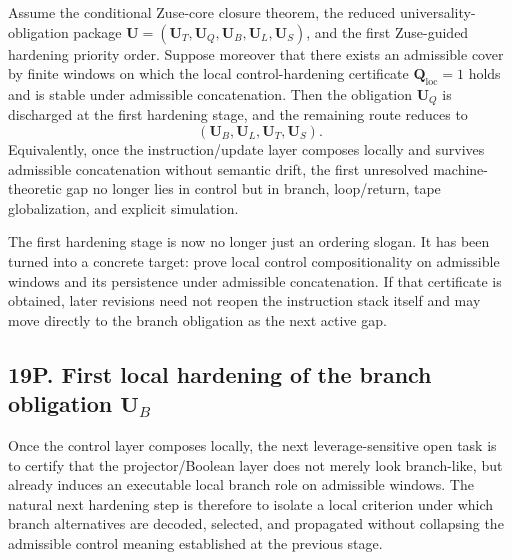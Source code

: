 \begin{proposition}
Assume the conditional Zuse-core closure theorem, the reduced universality-obligation package \(\mathbf U=(\mathbf U_T,\mathbf U_Q,\mathbf U_B,\mathbf U_L,\mathbf U_S)\), and the first Zuse-guided hardening priority order. Suppose moreover that there exists an admissible cover by finite windows on which the local control-hardening certificate \(\mathbf Q_{\mathrm{loc}}=1\) holds and is stable under admissible concatenation. Then the obligation \(\mathbf U_Q\) is discharged at the first hardening stage, and the remaining route reduces to
\[
(\mathbf U_B,\mathbf U_L,\mathbf U_T,\mathbf U_S).
\]
Equivalently, once the instruction/update layer composes locally and survives admissible concatenation without semantic drift, the first unresolved machine-theoretic gap no longer lies in control but in branch, loop/return, tape globalization, and explicit simulation.
\end{proposition}

\begin{corollary}
The first hardening stage is now no longer just an ordering slogan. It has been turned into a concrete target: prove local control compositionality on admissible windows and its persistence under admissible concatenation. If that certificate is obtained, later revisions need not reopen the instruction stack itself and may move directly to the branch obligation as the next active gap.
\end{corollary}


\subsection*{19P. First local hardening of the branch obligation $\mathbf U_B$}
Once the control layer composes locally, the next leverage-sensitive open task is to certify that the projector/Boolean layer does not merely look branch-like, but already induces an executable local branch role on admissible windows. The natural next hardening step is therefore to isolate a local criterion under which branch alternatives are decoded, selected, and propagated without collapsing the admissible control meaning established at the previous stage.

